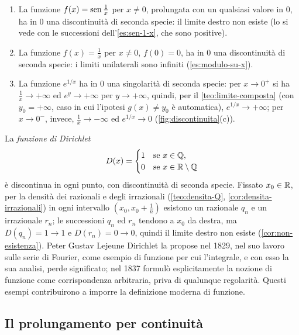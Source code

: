 \begin{esempio}\label{es:seconda-specie}
\begin{enumerate}[label=\textup{(\roman*)}]
  \item La funzione $f(x)=\operatorname{sen}\frac1x$ per $x\neq0$, prolungata con un qualsiasi valore
  in $0$, ha in $0$ una discontinuità di seconda specie: il limite destro non esiste
  (lo si vede con le successioni dell'\cref{es:sen-1-x}, che sono positive).
  \item La funzione $f(x)=\frac1x$ per $x\neq0$, $f(0)=0$, ha in $0$ una discontinuità di
  seconda specie: i limiti unilaterali sono infiniti (\cref{es:modulo-su-x}).
  \item La funzione $e^{1/x}$ ha in $0$ una singolarità di seconda specie: per $x\to0^{+}$
  si ha $\frac1x\to+\infty$ ed $e^{y}\to+\infty$ per $y\to+\infty$, quindi, per il
  \cref{teo:limite-composta} (con $y_{0}=+\infty$, caso in cui l'ipotesi $g(x)\neq y_{0}$
  è automatica), $e^{1/x}\to+\infty$; per $x\to0^{-}$, invece, $\frac1x\to-\infty$ ed
  $e^{1/x}\to0$ (\cref{fig:discontinuita}(c)).
\end{enumerate}
\end{esempio}

\begin{osservazione}\label{oss:dirichlet}
La \emph{funzione di Dirichlet}
\[
  D(x)=
  \begin{cases}
    1 & \text{se } x\in\mathbb{Q},\\
    0 & \text{se } x\in\mathbb{R}\setminus\mathbb{Q}
  \end{cases}
\]
è discontinua in ogni punto, con discontinuità di seconda specie. Fissato $x_{0}\in\mathbb{R}$,
per la densità dei razionali e degli irrazionali (\cref{teo:densita-Q},
\cref{cor:densita-irrazionali}) in ogni intervallo $(x_{0},x_{0}+\frac1n)$ esistono un
razionale $q_{n}$ e un irrazionale $r_{n}$; le successioni $q_{n}$ ed $r_{n}$ tendono a
$x_{0}$ da destra, ma $D(q_{n})=1\to1$ e $D(r_{n})=0\to0$, quindi il limite destro non
esiste (\cref{cor:non-esistenza}). Peter Gustav Lejeune Dirichlet la propose nel 1829,
nel suo lavoro sulle serie di Fourier, come esempio di funzione per cui l'integrale, e
con esso la sua analisi, perde significato; nel 1837 formulò esplicitamente la nozione di
funzione come corrispondenza arbitraria, priva di qualunque regolarità. Questi esempi
contribuirono a imporre la definizione moderna di funzione.
\end{osservazione}

\subsection{Il prolungamento per continuità}

